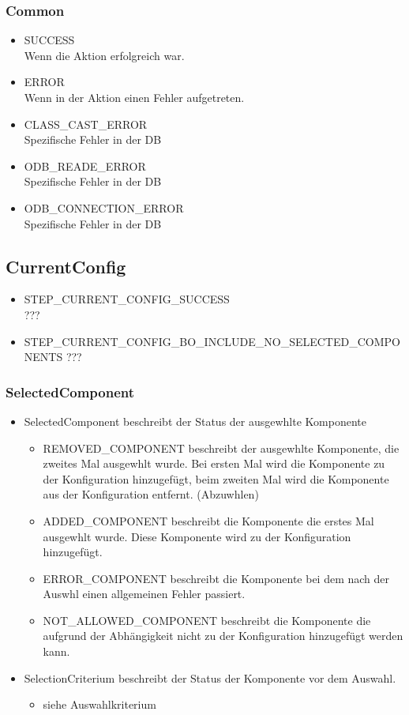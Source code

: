 \documentclass{article}
\begin{document}
\subsubsection{Common}

\begin{itemize}
	\item SUCCESS\\
		Wenn die Aktion erfolgreich war.
	\item ERROR\\
		Wenn in der Aktion einen Fehler aufgetreten.
	\item CLASS\_CAST\_ERROR\\
		Spezifische Fehler in der DB
	\item ODB\_READE\_ERROR\\
		Spezifische Fehler in der DB
	\item ODB\_CONNECTION\_ERROR\\
		Spezifische Fehler in der DB
\end{itemize}

\subsection{CurrentConfig}

\begin{itemize}
	\item STEP\_CURRENT\_CONFIG\_SUCCESS\\
		???
	\item STEP\_CURRENT\_CONFIG\_BO\_INCLUDE\_NO\_SELECTED\_COMPONENTS
		???
\end{itemize}

\subsubsection{SelectedComponent}
\begin{itemize}
  \item SelectedComponent beschreibt der Status der ausgewhlte Komponente
  \begin{itemize}
    \item REMOVED\_COMPONENT beschreibt der ausgewhlte Komponente, die
    zweites Mal ausgewhlt wurde. Bei ersten Mal wird die Komponente zu der
    Konfiguration hinzugef\"ugt, beim zweiten Mal wird die Komponente aus der
    Konfiguration entfernt. (Abzuwhlen)
    \item ADDED\_COMPONENT beschreibt die Komponente die erstes Mal ausgewhlt
    wurde. Diese Komponente wird zu der Konfiguration hinzugefügt.
    \item ERROR\_COMPONENT beschreibt die Komponente bei dem nach der Auswhl
    einen allgemeinen Fehler passiert.
    \item NOT\_ALLOWED\_COMPONENT beschreibt die Komponente die aufgrund der
    Abh\"angigkeit nicht zu der Konfiguration hinzugef\"ugt werden kann.
  \end{itemize}
  \item SelectionCriterium beschreibt der Status der Komponente vor dem Auswahl.
  \begin{itemize}
    \item siehe Auswahlkriterium
  \end{itemize}
\end{itemize}
\end{document}
